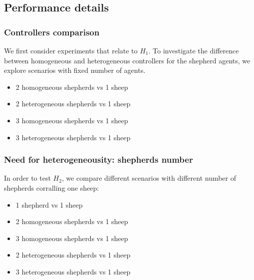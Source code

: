 \documentclass[conference]{IEEEtran}
\begin{document}
\subsection{Performance details}
\label{sec:experiments_performances}
\vspace{0.5em}
\subsubsection{Controllers comparison}
We first consider experiments that relate to $H_1$. To investigate the difference between homogeneous and heterogeneous controllers for the shepherd agents, we explore scenarios with fixed number of agents. 
\begin{itemize}
	\item 2 homogeneous shepherds vs 1 sheep
	\item 2 heterogeneous shepherds vs 1 sheep
	\item 3 homogeneous shepherds vs 1 sheep
	\item 3 heterogeneous shepherds vs 1 sheep
\end{itemize}

\vspace{0.5em}
\subsubsection{Need for heterogeneousity: shepherds number}
In order to test $H_2$, we compare different scenarios with different number of shepherds corralling one sheep:
\begin{itemize}
	\item 1 shepherd vs 1 sheep	
	\item 2 homogeneous shepherds vs 1 sheep
	\item 3 homogeneous shepherds vs 1 sheep
	\item 2 heterogeneous shepherds vs 1 sheep
	\item 3 heterogeneous shepherds vs 1 sheep
	
\end{itemize}

\vspace{0.5em}
\end{document}
